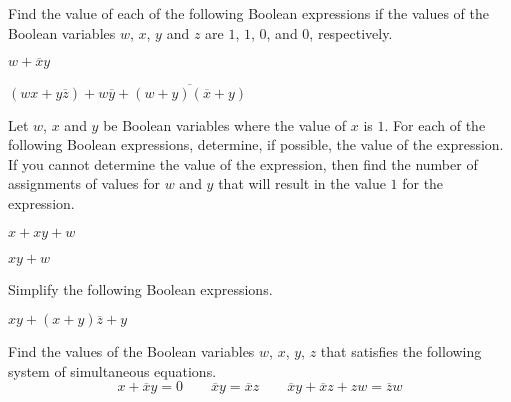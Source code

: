 \documentclass[a4paper, english, 12pt]{article} %
\begin{document}

\begin{problem}[1]
  Find the value of each of the following Boolean expressions if the values of
  the Boolean variables $w$, $x$, $y$ and $z$ are $1$, $1$, $0$, and $0$,
  respectively.
\end{problem}

\begin{subproblem}[2]
  $w + \overline{x}y$
\end{subproblem} 

\begin{subproblem}[4]
  $(wx + y \overline{z}) + w \overline{y} + \overline{(w+y)(\overline{x}+y)}$
\end{subproblem} 

\begin{problem}
  Let $w$, $x$ and $y$ be Boolean variables where the value of $x$ is $1$. For
  each of the following Boolean expressions, determine, if possible, the value
  of the expression. If you cannot determine the value of the expression, then
  find the number of assignments of values for $w$ and $y$ that will result in
  the value $1$ for the expression. 
\end{problem}

\begin{subproblem}
  $x + xy + w$
\end{subproblem} 

\begin{subproblem}
  $xy + w$
\end{subproblem} 

\begin{problem}[11]
  Simplify the following Boolean expressions.
\end{problem}

\begin{subproblem}
  $xy + (x + y)\overline{z} + y$
\end{subproblem} 

\begin{problem}
  Find the values of the Boolean variables $w$, $x$, $y$, $z$ that satisfies the
  following system of simultaneous equations.
  \begin{equation*}
    x + \overline{x} y = 0 \qquad
    \overline{x} y = \overline{x} z \qquad
    \overline{x} y + \overline{x} z + z w = \overline{z} w 
  \end{equation*}
\end{problem}

\end{document}
